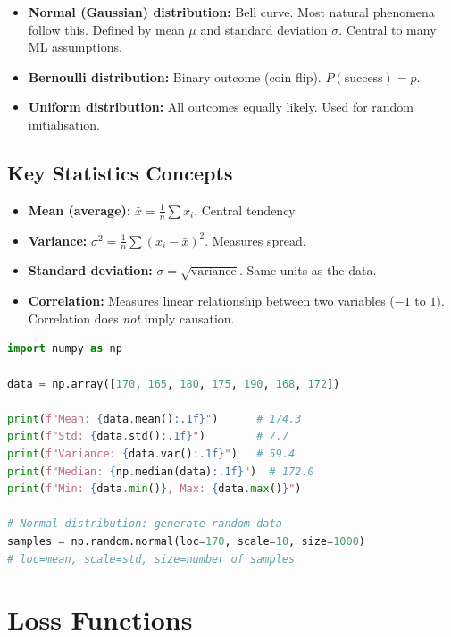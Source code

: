 \documentclass[12pt, a4paper, oneside]{book}
\begin{document}
\begin{itemize}[leftmargin=2em]
    \item \textbf{Normal (Gaussian) distribution:} Bell curve. Most natural phenomena follow this. Defined by mean $\mu$ and standard deviation $\sigma$. Central to many ML assumptions.
    \item \textbf{Bernoulli distribution:} Binary outcome (coin flip). $P(\text{success}) = p$.
    \item \textbf{Uniform distribution:} All outcomes equally likely. Used for random initialisation.
\end{itemize}

\subsection{Key Statistics Concepts}

\begin{itemize}[leftmargin=2em]
    \item \textbf{Mean (average):} $\bar{x} = \frac{1}{n}\sum x_i$. Central tendency.
    \item \textbf{Variance:} $\sigma^2 = \frac{1}{n}\sum (x_i - \bar{x})^2$. Measures spread.
    \item \textbf{Standard deviation:} $\sigma = \sqrt{\text{variance}}$. Same units as the data.
    \item \textbf{Correlation:} Measures linear relationship between two variables ($-1$ to $1$). Correlation does \emph{not} imply causation.
\end{itemize}

\begin{lstlisting}[language=Python, caption={Statistics in Python}]
import numpy as np

data = np.array([170, 165, 180, 175, 190, 168, 172])

print(f"Mean: {data.mean():.1f}")      # 174.3
print(f"Std: {data.std():.1f}")        # 7.7
print(f"Variance: {data.var():.1f}")   # 59.4
print(f"Median: {np.median(data):.1f}")  # 172.0
print(f"Min: {data.min()}, Max: {data.max()}")

# Normal distribution: generate random data
samples = np.random.normal(loc=170, scale=10, size=1000)
# loc=mean, scale=std, size=number of samples
\end{lstlisting}

\section{Loss Functions}
\end{document}
